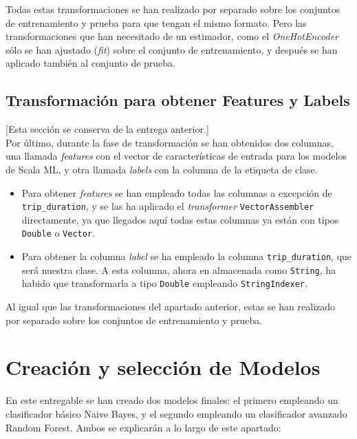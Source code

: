 \documentclass[12pt]{article}
\begin{document}
Todas estas transformaciones se han realizado por separado sobre los conjuntos de entrenamiento y prueba para que tengan el mismo formato. Pero las transformaciones que han necesitado de un estimador, como el \textit{OneHotEncoder} sólo se han ajustado (\textit{fit}) sobre el conjunto de entrenamiento, y después se han aplicado también al conjunto de prueba.

\subsection{Transformación para obtener Features y Labels}

[Esta sección se conserva de la entrega anterior.]\\

Por último, durante la fase de transformación se han obtenidos dos columnas, una llamada \textit{features} con el vector de características de entrada para los modelos de Scala ML, y otra llamada \textit{labels} con la columna de la etiqueta de clase.

\begin{itemize}
    \item Para obtener \textit{features} se han empleado todas las columnas a excepción de \texttt{trip\_duration}, y se las ha aplicado el \textit{transformer} \texttt{VectorAssembler} directamente, ya que llegados aquí todas estas columnas ya están con tipos \texttt{Double} o \texttt{Vector}.
    \item Para obtener la columna \textit{label} se ha empleado la columna \texttt{trip\_duration}, que será nuestra clase. A esta columna, ahora en almacenada como \texttt{String}, ha habido que transformarla a tipo \texttt{Double} empleando \texttt{StringIndexer}.
\end{itemize}

Al igual que las transformaciones del apartado anterior, estas se han realizado por separado sobre los conjuntos de entrenamiento y prueba.\\

\section{Creación y selección de Modelos}
En este entregable se han creado dos modelos finales: el primero empleando un clasificador básico Naive Bayes, y el segundo empleando un clasificador avanzado Random Forest. Ambos se explicarán a lo largo de este apartado:
\end{document}
